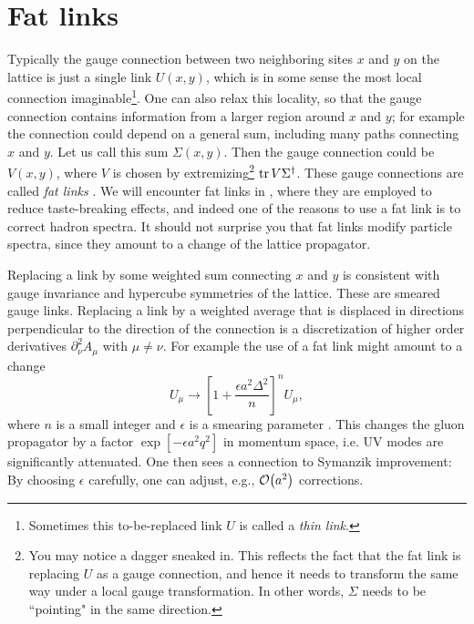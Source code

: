 \section{Fat links}

Typically the gauge connection between two neighboring sites $x$ and $y$
on the lattice is just a single link $U(x,y)$, which is in some sense the 
most local connection imaginable\footnote{Sometimes this to-be-replaced
link $U$ is called a {\it thin link}.}. 
One can also relax this locality, so that 
the gauge connection contains information from a larger region around 
$x$ and $y$; for example the connection could depend on a general sum, 
including many paths connecting $x$ and $y$. Let us call
this sum $\Sigma(x,y)$. Then the gauge connection could be $V(x,y)$,
where $V$ is chosen by extremizing\footnote{You may notice a dagger sneaked in.
This reflects the fact that the fat link is replacing $U$ as a gauge connection,
and hence it needs to transform the same way under a local gauge transformation.
In other words, $\Sigma$ needs to be ``pointing" in the same direction.}
 $\tr V\Sigma^\dagger$. These gauge
connections are called {\it fat links} \cite{blum_improving_1997}. 
We will encounter fat links in , where they are employed to reduce
taste-breaking effects, and indeed one of the reasons to use a fat link
is to correct hadron spectra. It should not surprise you that fat links
modify particle spectra, since they amount to a change of the lattice 
propagator.

Replacing a link by some weighted sum connecting $x$ and $y$ is consistent
with gauge invariance and hypercube symmetries of the lattice. These are
smeared gauge links. Replacing a link by a weighted average that is displaced
in directions perpendicular to the direction of the connection is a
discretization of higher order derivatives $\partial^2_\nu A_\mu$
\cite{blum_improving_1997} with $\mu\neq\nu$. For example the use of a
fat link might amount to a change
\begin{equation}
  U_\mu\to \left[1+\frac{\epsilon a^2 \Delta^2}{n}\right]^n U_\mu,
\end{equation} 
where $n$ is a small integer and $\epsilon$ is a smearing parameter
\cite{lepage:1997id}. This changes the gluon propagator by a factor
$\exp[-\epsilon a^2q^2]$ in momentum space, i.e. UV modes are 
significantly attenuated. One then sees a connection to Symanzik improvement:
By choosing $\epsilon$ carefully, one can adjust, e.g., 
$\order{a^2}$ corrections.

